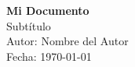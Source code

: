 \documentclass{article}
\begin{document}
\begin{titlepage}
    \centering
    \vspace*{3cm}
    {\Huge\textbf{Mi Documento}}\\
    \vspace{1cm}
    {\Large Subtítulo}\\
    \vspace{2cm}
    {\large Autor: Nombre del Autor}\\
    \vfill
    {\large Fecha: \today}\\
    \vspace{3cm}
\end{titlepage}
\end{document}
